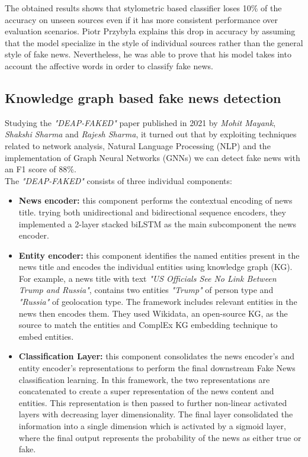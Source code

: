 \documentclass[10pt, english]{report}
\begin{document}
The obtained results shows that stylometric based classifier loses 10\% of the accuracy on unseen sources even if it has more consistent performance over evaluation scenarios. Piotr Przybyła explains this drop in accuracy by assuming that the model specialize in the style of individual sources rather than the general style of fake news. Nevertheless, he was able to prove that his model takes into account the affective words in order to classify fake news.
\subsection{Knowledge graph based fake news detection}
Studying the \textit{"DEAP-FAKED"} paper published in 2021 by \textit{Mohit Mayank}, \textit{Shakshi Sharma} and \textit{Rajesh Sharma}, it turned out that by exploiting techniques related to network analysis, Natural Language Processing (NLP) and the implementation of Graph Neural Networks (GNNs) we can detect fake news with an F1 score of 88\%.\\

The \textit{"DEAP-FAKED"} consists of three individual components:

\begin{itemize}
\item \textbf{News encoder:} this component performs the contextual encoding of news title. trying both unidirectional and bidirectional sequence encoders, they implemented a 2-layer stacked biLSTM as the main subcomponent the news encoder.
\item \textbf{Entity encoder:} this component identifies the named entities present in the news title and encodes the individual entities using knowledge graph (KG).
For example, a news title with text \textit{"US Officials See No Link Between Trump and Russia"}, contains two entities \textit{"Trump"} of person type and \textit{"Russia"} of geolocation type.
The framework includes relevant entities in the news then encodes them. They used Wikidata, an open-source KG, as the source to match the entities and ComplEx KG embedding technique to embed entities.
\item \textbf{Classification Layer:} this component consolidates the news encoder's and entity encoder's representations to perform the final downstream Fake News classification learning.
In this framework, the two representations are concatenated to create a super representation of the news content and entities. This representation is then passed to further non-linear activated layers with decreasing layer dimensionality. The final layer consolidated the information into a single dimension which is activated by a sigmoid layer, where the final output represents the probability of the news as either true or fake.
\end{itemize}
\end{document}

